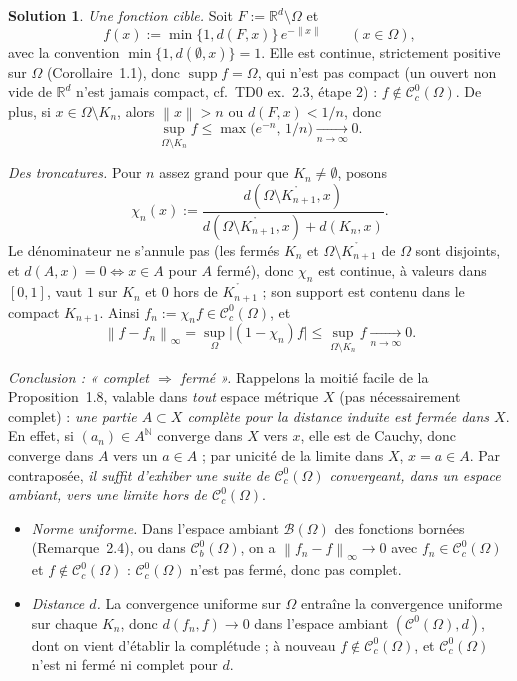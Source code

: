 \documentclass[11pt,a4paper]{article}
\newcommand{\R}{\mathbb{R}}
\newcommand{\N}{\mathbb{N}}
\newcommand{\interieur}[1]{\mathring{#1}}
\newcommand{\norm}[1]{\left\|#1\right\|}
\newcommand{\Cz}{\mathcal{C}^0}
\newcommand{\Cc}{\mathcal{C}^0_c}
\DeclareMathOperator{\supp}{supp}
\theoremstyle{definition}
\newtheorem*{solution}{Solution}
\begin{document}
\begin{solution}
\emph{Une fonction cible.} Soit $F:=\R^d\setminus\Omega$ et
\[
f(x):=\min\{1,d(F,x)\}\,e^{-\norm x}\qquad(x\in\Omega),
\]
avec la convention $\min\{1,d(\emptyset,x)\}=1$. Elle est continue, strictement positive sur $\Omega$ (Corollaire~1.1), donc $\supp f=\Omega$, qui n'est pas compact (un ouvert non vide de $\R^d$ n'est jamais compact, cf.\ TD0 ex.~2.3, étape 2) : $f\notin\Cc(\Omega)$. De plus, si $x\in\Omega\setminus K_n$, alors $\norm x>n$ ou $d(F,x)<1/n$, donc
\[
\sup_{\Omega\setminus K_n}f\le\max\big(e^{-n},\,1/n\big)\xrightarrow[n\to\infty]{}0 .
\]

\emph{Des troncatures.} Pour $n$ assez grand pour que $K_n\ne\emptyset$, posons
\[
\chi_n(x):=\frac{d(\Omega\setminus\interieur{K_{n+1}},x)}{d(\Omega\setminus\interieur{K_{n+1}},x)+d(K_n,x)} .
\]
Le dénominateur ne s'annule pas (les fermés $K_n$ et $\Omega\setminus\interieur{K_{n+1}}$ de $\Omega$ sont disjoints, et $d(A,x)=0\iff x\in A$ pour $A$ fermé), donc $\chi_n$ est continue, à valeurs dans $[0,1]$, vaut $1$ sur $K_n$ et $0$ hors de $\interieur{K_{n+1}}$ ; son support est contenu dans le compact $K_{n+1}$. Ainsi $f_n:=\chi_nf\in\Cc(\Omega)$, et
\[
\norm{f-f_n}_\infty=\sup_{\Omega}\big|(1-\chi_n)f\big|\le\sup_{\Omega\setminus K_n}f\xrightarrow[n\to\infty]{}0 .
\]

\emph{Conclusion : « complet $\Rightarrow$ fermé ».} Rappelons la moitié facile de la Proposition~1.8, valable dans \emph{tout} espace métrique $X$ (pas nécessairement complet) : \emph{une partie $A\subset X$ complète pour la distance induite est fermée dans $X$}. En effet, si $(a_n)\in A^\N$ converge dans $X$ vers $x$, elle est de Cauchy, donc converge dans $A$ vers un $a\in A$ ; par unicité de la limite dans $X$, $x=a\in A$. Par contraposée, \emph{il suffit d'exhiber une suite de $\Cc(\Omega)$ convergeant, dans un espace ambiant, vers une limite hors de $\Cc(\Omega)$}.

\begin{itemize}
  \item \emph{Norme uniforme.} Dans l'espace ambiant $\mathcal B(\Omega)$ des fonctions bornées (Remarque~2.4), ou dans $\Cz_b(\Omega)$, on a $\norm{f_n-f}_\infty\to0$ avec $f_n\in\Cc(\Omega)$ et $f\notin\Cc(\Omega)$ : $\Cc(\Omega)$ n'est pas fermé, donc pas complet.
  \item \emph{Distance $d$.} La convergence uniforme sur $\Omega$ entraîne la convergence uniforme sur chaque $K_n$, donc $d(f_n,f)\to0$ dans l'espace ambiant $(\Cz(\Omega),d)$, dont on vient d'établir la complétude ; à nouveau $f\notin\Cc(\Omega)$, et $\Cc(\Omega)$ n'est ni fermé ni complet pour $d$.
\end{itemize}


\end{solution}
\end{document}
